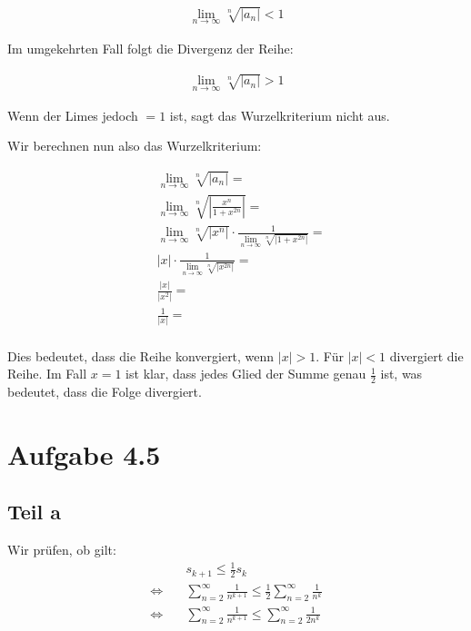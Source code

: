 \documentclass[a4paper,german,12pt,smallheadings]{scrartcl}
\begin{document}
\begin{align*}
  \lim_{n \to \infty} \sqrt[n]{\left| a_n \right|} < 1
\end{align*}

Im umgekehrten Fall folgt die Divergenz der Reihe:

\begin{align*}
  \lim_{n \to \infty} \sqrt[n]{\left| a_n \right|} > 1
\end{align*}

Wenn der Limes jedoch $=1$ ist, sagt das Wurzelkriterium nicht aus.

Wir berechnen nun also das Wurzelkriterium:

\begin{align*}
  &\lim_{n \to \infty} \sqrt[n]{\left| a_n \right|} = \\
  &\lim_{n \to \infty} \sqrt[n]{\left| \frac{x^n}{1+x^{2n}} \right|} = \\
  &\lim_{n \to \infty} \sqrt[n]{\left| x^n \right|} \cdot \frac{1}{\lim_{n \to \infty} \sqrt[n]{\left| 1+x^{2n} \right|}} = \\
  &|x| \cdot \frac{1}{\lim_{n \to \infty} \sqrt[n]{\left| x^{2n} \right|}} = \\
  &\frac{|x|}{\left| x^2 \right|} =\\
  &\frac{1}{\left| x \right|} =\\
\end{align*}

Dies bedeutet, dass die Reihe konvergiert, wenn $|x| > 1$. Für $|x| < 1$
divergiert die Reihe. Im Fall $x = 1$ ist klar, dass jedes Glied der Summe
genau $\frac{1}{2}$ ist, was bedeutet, dass die Folge divergiert.

\section*{Aufgabe 4.5}
\subsection*{Teil a}

Wir prüfen, ob gilt:
\begin{align*}
  &s_{k+1} \le \frac{1}{2}s_k \\
  \Leftrightarrow\quad&\sum_{n=2}^{\infty} \frac{1}{n^{k+1}} \le \frac{1}{2} \sum_{n=2}^{\infty} \frac{1}{n^k} \\
  \Leftrightarrow\quad&\sum_{n=2}^{\infty} \frac{1}{n^{k+1}} \le \sum_{n=2}^{\infty} \frac{1}{2n^k}
\end{align*}
\end{document}
